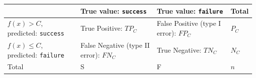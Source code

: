 \documentclass[]{krantz}
\begin{document}
\begin{longtable}[]{@{}llll@{}}
\toprule
\begin{minipage}[b]{0.22\columnwidth}\raggedright
\strut
\end{minipage} & \begin{minipage}[b]{0.24\columnwidth}\raggedright
True value: \texttt{success}\strut
\end{minipage} & \begin{minipage}[b]{0.32\columnwidth}\raggedright
True value: \texttt{failure}\strut
\end{minipage} & \begin{minipage}[b]{0.11\columnwidth}\raggedright
Total\strut
\end{minipage}\tabularnewline
\midrule
\endhead
\begin{minipage}[t]{0.22\columnwidth}\raggedright
\(f(x) > C\), predicted: \texttt{success}\strut
\end{minipage} & \begin{minipage}[t]{0.24\columnwidth}\raggedright
True Positive: \(TP_C\)\strut
\end{minipage} & \begin{minipage}[t]{0.32\columnwidth}\raggedright
False Positive (type I error): \(FP_C\)\strut
\end{minipage} & \begin{minipage}[t]{0.11\columnwidth}\raggedright
\(P_C\)\strut
\end{minipage}\tabularnewline
\begin{minipage}[t]{0.22\columnwidth}\raggedright
\(f(x) \leq C\), predicted: \texttt{failure}\strut
\end{minipage} & \begin{minipage}[t]{0.24\columnwidth}\raggedright
False Negative (type II error): \(FN_C\)\strut
\end{minipage} & \begin{minipage}[t]{0.32\columnwidth}\raggedright
True Negative: \(TN_C\)\strut
\end{minipage} & \begin{minipage}[t]{0.11\columnwidth}\raggedright
\(N_C\)\strut
\end{minipage}\tabularnewline
\begin{minipage}[t]{0.22\columnwidth}\raggedright
Total\strut
\end{minipage} & \begin{minipage}[t]{0.24\columnwidth}\raggedright
S\strut
\end{minipage} & \begin{minipage}[t]{0.32\columnwidth}\raggedright
F\strut
\end{minipage} & \begin{minipage}[t]{0.11\columnwidth}\raggedright
\(n\)\strut
\end{minipage}\tabularnewline
\bottomrule
\end{longtable}
\end{document}
